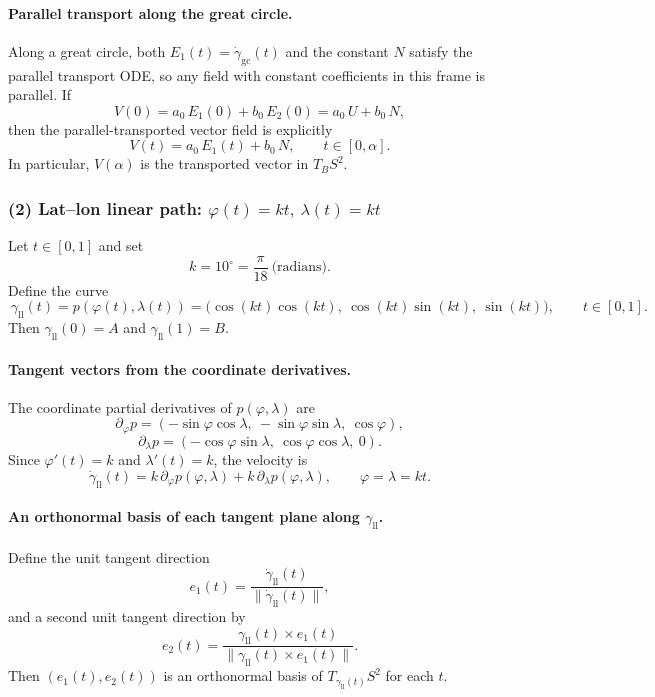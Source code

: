 \documentclass[12pt,a4paper]{article}
\theoremstyle{plain}
\theoremstyle{definition}      %
\begin{document}
\paragraph{Parallel transport along the great circle.}
Along a great circle, both $E_1(t)=\dot\gamma_{\mathrm{gc}}(t)$ and the constant $N$ satisfy the parallel transport ODE,
so any field with constant coefficients in this frame is parallel.
If
\[
V(0)=a_0\,E_1(0)+b_0\,E_2(0)=a_0\,U+b_0\,N,
\]
then the parallel-transported vector field is explicitly
\[
\boxed{\ V(t)=a_0\,E_1(t)+b_0\,N,\qquad t\in[0,\alpha].\ }
\]
In particular, $V(\alpha)$ is the transported vector in $T_BS^2$.

\subsubsection*{(2) Lat--lon linear path: $\varphi(t)=kt,\ \lambda(t)=kt$}

Let $t\in[0,1]$ and set
\[
k=10^\circ=\frac{\pi}{18}\ \text{(radians)}.
\]
Define the curve
\[
\boxed{\ \gamma_{\mathrm{ll}}(t)=p(\varphi(t),\lambda(t))=
	\big(\cos(kt)\cos(kt),\ \cos(kt)\sin(kt),\ \sin(kt)\big),\qquad t\in[0,1].\ }
\]
Then $\gamma_{\mathrm{ll}}(0)=A$ and $\gamma_{\mathrm{ll}}(1)=B$.

\paragraph{Tangent vectors from the coordinate derivatives.}
The coordinate partial derivatives of $p(\varphi,\lambda)$ are
\[
\partial_\varphi p=(-\sin\varphi\cos\lambda,\ -\sin\varphi\sin\lambda,\ \cos\varphi),
\]
\[
\partial_\lambda p=(-\cos\varphi\sin\lambda,\ \cos\varphi\cos\lambda,\ 0).
\]
Since $\varphi'(t)=k$ and $\lambda'(t)=k$, the velocity is
\[
\dot\gamma_{\mathrm{ll}}(t)=k\,\partial_\varphi p(\varphi,\lambda)+k\,\partial_\lambda p(\varphi,\lambda),
\qquad \varphi=\lambda=kt.
\]

\paragraph{An orthonormal basis of each tangent plane along $\gamma_{\mathrm{ll}}$.}
Define the unit tangent direction
\[
e_1(t)=\frac{\dot\gamma_{\mathrm{ll}}(t)}{\|\dot\gamma_{\mathrm{ll}}(t)\|},
\]
and a second unit tangent direction by
\[
e_2(t)=\frac{\gamma_{\mathrm{ll}}(t)\times e_1(t)}{\|\gamma_{\mathrm{ll}}(t)\times e_1(t)\|}.
\]
Then $(e_1(t),e_2(t))$ is an orthonormal basis of $T_{\gamma_{\mathrm{ll}}(t)}S^2$ for each $t$.
\end{document}
